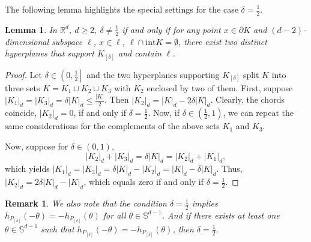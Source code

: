 \documentclass[12pt,letterpaper,reqno]{amsart}
\newtheorem{lemma}{Lemma}
\newtheorem{remark}{Remark}
\begin{document}
The following lemma highlights the special settings for the case $\delta = \frac 1 2$.
\begin{lemma}\label{Sus}
    In $\mathbb{R}^d$, $d \geq 2$, $\delta \neq \frac{1}{2}$ if and only if for any point $x \in \partial K$ and $(d-2)$-dimensional subspace $\ell$, $x \in \ell$, $\ell \cap \text{int}K = \emptyset$, there exist two distinct hyperplanes that support $K_{[\delta]}$ and contain $\ell$.
\end{lemma} 

\begin{proof}
    Let $\delta \in \left(0, \frac 1 2 \right]$ and the two hyperplanes supporting $K_{[\delta]}$ split $K$ into three sets $K = K_1 \cup K_2 \cup K_3$ with $K_2$ enclosed by two of them. First, suppose $|K_1|_d=|K_3|_d=\delta |K|_d \leq \frac{|K|}{2}$. Then $|K_2|_d = |K|_d-2\delta|K|_d$. Clearly, the chords coincide, $|K_2|_d=0$, if and only if $\delta = \frac{1}{2}$. Now, if $\delta \in \left(\frac 1 2, 1 \right)$, we can repeat the same considerations for the complements of the above sets $K_1$ and $K_3$.

    Now, suppose for $\delta \in (0,1)$,  $$|K_2|_d+|K_3|_d = \delta |K|_d = |K_2|_d+|K_1|_d,$$ which yields $|K_1|_d = |K_3|_d = \delta|K|_d - |K_2|_d = |K|_d-\delta|K|_d$. Thus, $|K_2|_d = 2\delta|K|_d - |K|_d$, which equals zero if and only if $\delta = \frac{1}{2}$.
\end{proof}

\begin{remark}
We also note that the condition $\delta = \frac 1 2$ implies $h_{P_{[\delta]}}(-\theta) = -h_{P_{[\delta]}}(\theta)$ for all $\theta \in \mathbb{S}^{d-1}$. And if there exists at least one $\theta \in \mathbb{S}^{d-1}$ such that $h_{P_{[\delta]}}(-\theta) = -h_{P_{[\delta]}}(\theta)$, then $\delta = \frac 1 2$.
\end{remark}
\end{document}
